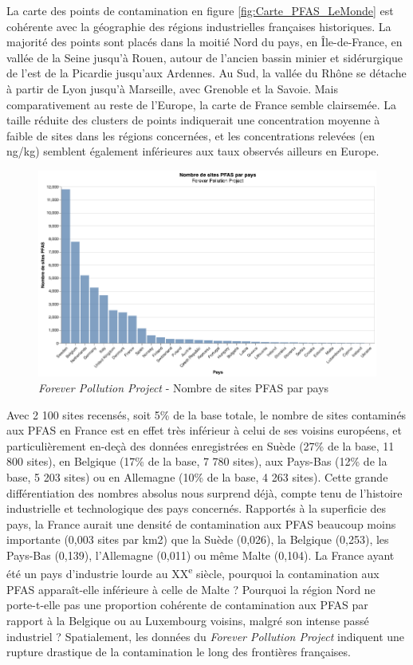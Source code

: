 \documentclass[a4paper,twoside,12pt]{book}
\newcommand{\siecle}[1]{\textsc{#1}\textsuperscript{e} siècle}
\begin{document}
La carte des points de contamination en figure \ref{fig:Carte_PFAS_LeMonde} est cohérente avec la géographie des régions industrielles françaises historiques. La majorité des points sont placés dans la moitié Nord du pays, en Île-de-France, en vallée de la Seine jusqu'à Rouen, autour de l'ancien bassin minier et sidérurgique de l'est de la Picardie jusqu'aux Ardennes. Au Sud, la vallée du Rhône se détache à partir de Lyon jusqu'à Marseille, avec Grenoble et la Savoie. Mais comparativement au reste de l'Europe, la carte de France semble clairsemée. La taille réduite des clusters de points indiquerait une concentration moyenne à faible de sites dans les régions concernées, et les concentrations relevées (en ng/kg) semblent également inférieures aux taux observés ailleurs en Europe. \\

\begin{figure}[!h]
\centering
\includegraphics[width=1\textwidth]{img/intro/FPP_PFASbyEUCountry.png}
\caption{\textit{Forever Pollution Project} - Nombre de sites PFAS par pays}
\label{fig:FPP_pfas_per_country}
\end{figure}

Avec 2 100 sites recensés, soit 5\% de la base totale, le nombre de sites contaminés aux PFAS en France est en effet très inférieur à celui de ses voisins européens, et particulièrement en-deçà des données enregistrées en Suède (27\% de la base, 11 800 sites), en Belgique (17\% de la base, 7 780 sites), aux  Pays-Bas (12\% de la base, 5 203 sites) ou en Allemagne (10\% de la base, 4 263 sites). Cette grande différentiation des nombres absolus nous surprend déjà, compte tenu de l'histoire industrielle et technologique des pays concernés. Rapportés à la superficie des pays, la France aurait une densité de contamination aux PFAS beaucoup moins importante (0,003 sites par km2) que la Suède (0,026), la Belgique (0,253), les Pays-Bas (0,139), l'Allemagne (0,011) ou même Malte (0,104). La France ayant été un pays d'industrie lourde au \siecle{XX}, pourquoi la contamination aux PFAS apparaît-elle inférieure à celle de Malte ? Pourquoi la région Nord ne porte-t-elle pas une proportion cohérente de contamination aux PFAS par rapport à la Belgique ou au Luxembourg voisins, malgré son intense passé industriel ? Spatialement, les données du \textit{Forever Pollution Project} indiquent une rupture drastique de la contamination le long des frontières françaises. 
\end{document}
